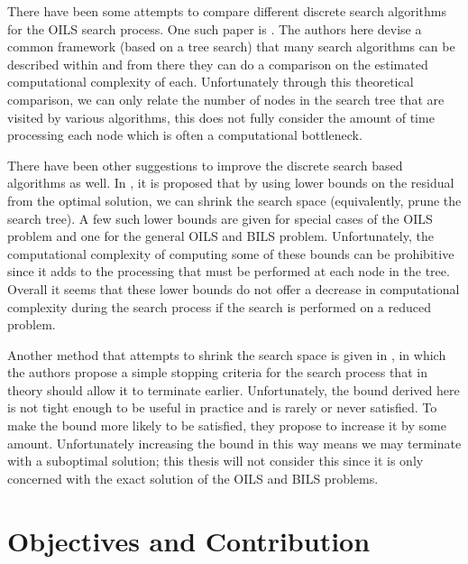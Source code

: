 \documentclass[12pt,Bold,letterpaper]{mcgilletdclass}
\newcommand{\vsp}{\vspace{\baselineskip}}
\begin{document}
There have been some attempts to compare different discrete search algorithms for the OILS search process. One such paper is \cite{MurGDC06}. The authors here devise a common framework (based on a tree search) that many search algorithms can be described within and from there they can do a comparison on the estimated computational complexity of each. Unfortunately through this theoretical comparison, we can only relate the number of nodes in the search tree that are visited by various algorithms, this does not fully consider the amount of time processing each node which is often a computational bottleneck.

There have been other suggestions to improve the discrete search based algorithms as well. In \cite{StoVH08}, it is proposed that by using lower bounds on the residual from the optimal solution, we can shrink the search space (equivalently, prune the search tree). A few such lower bounds are given for special cases of the OILS problem and one for the general OILS and BILS problem. Unfortunately, the computational complexity of computing some of these bounds can be prohibitive since it adds to the processing that must be performed at each node in the tree. Overall it seems that these lower bounds do not offer a decrease in computational complexity during the search process if the search is performed on a reduced problem.

Another method that attempts to shrink the search space is given in \cite{SchFL09}, in which the authors propose a simple stopping criteria for the search process that in theory should allow it to terminate earlier. Unfortunately, the bound derived here is not tight enough to be useful in practice and is rarely or never satisfied. To make the bound more likely to be satisfied, they propose to increase it by some amount. Unfortunately increasing the bound in this way means we may terminate with a suboptimal solution; this thesis will not consider this since it is only concerned with the exact solution of the OILS and BILS problems. 

\vsp \section{Objectives and Contribution}
\end{document}
